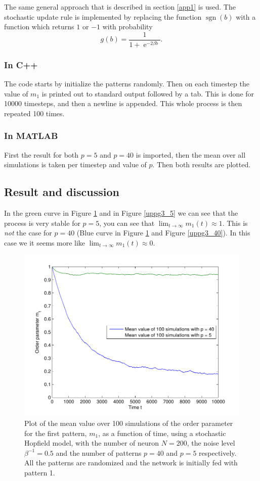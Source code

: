 \documentclass[12pt,a4paper]{article}
\begin{document}
The same general approach that is described in section \ref{app1} is used. The stochastic update rule is implemented by replacing the function $\operatorname{sgn}(b)$ with a function which returns $1$ or $-1$ with probability
$$ g(b) = \frac{1}{1 + \operatorname{e}^{-2 \beta b}}. $$

\subsubsection{In C++}
The code starts by initialize the patterns randomly.
Then on each timestep the value of $m_1$ is printed out to standard output
followed by a tab. This is done for 10000 timesteps, and then a newline is
appended. This whole process is then repeated 100 times.

\subsubsection{In MATLAB}
First the result for both $p=5$ and $p=40$ is imported, then the mean over
all simulations is taken per timestep and value of $p$. Then both results are plotted.

\subsection{Result and discussion}
In the green curve in Figure \ref{uppg3} and in Figure \ref{uppg3_5}
we can see that the process is very stable for $p=5$, you can see that
$\lim_{t \to \infty} m_1(t) \approx 1$. This is \emph{not} the case for $p
= 40$ (Blue curve in Figure \ref{uppg3} and Figure \ref{uppg3_40}). In this case we it seems more like $\lim_{t \to \infty} m_1(t) \approx 0$.

\begin{figure}\centering
\includegraphics[width=\textwidth]{uppg3.pdf}
\caption{\label{uppg3} Plot of the mean value over 100 simulations of the
order parameter for the first pattern, $m_1$, as a function of time, using
a stochastic Hopfield model, with the number of neuron $N = 200$, the
noise level $\beta^{-1} = 0.5$ and the number of patterns $p = 40$ and $p=5$
respectively. All the patterns are randomized and the network is initially fed with pattern 1. }
\end{figure}
\end{document}
